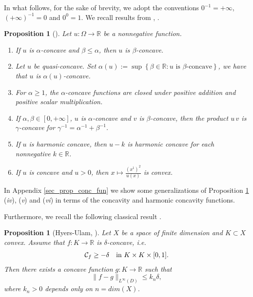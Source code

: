 \documentclass[11pt, reqno]{amsart}
\newtheorem{proposition}[lemma]{Proposition}
\theoremstyle{definition}
\numberwithin{equation}{section}
\newcommand{\R}{\mathbb{R}}
\newcommand{\tr}[1]{{\color{red} #1}}
\begin{document}
\medskip
In what follows, for the sake of brevity, we adopt the conventions $0^{-1}=+\infty$, $(+\infty)^{-1}=0$ and $0^0=1$.
We recall results from \cite[Section 2 and Lemma A2]{kennington}, \cite[Lemma 3.2]{kenningtonparabolic}.
\begin{proposition}[\cite{kennington, kenningtonparabolic}]
\label{alpha concavity property} 
Let $u\colon\Omega \to \R$ be a nonnegative function. 
	\begin{enumerate}[label=\textit{\roman*})]
		\item If $u$ is $\alpha$-concave and $\beta \leq \alpha$, then $u$ is $\beta$-concave. 
		\item Let $u$ be quasi-concave. 
		Set $ \alpha(u):=\sup \left\{\beta \in \R: u \text{ is }\beta\text{-concave}\right\}$, we have that $u$ is $\alpha(u)$-concave.
		\item For $\alpha\geq 1$, the $\alpha$-concave functions are closed under positive addition and positive scalar multiplication.
		\item If $\alpha,\beta \in [0, +\infty]$, 	$u$ is $\alpha$-concave and $v$ is $\beta$-concave, then the product $u \, v$ is $\gamma$-concave for $\gamma^{-1}=\alpha^{-1}+\beta^{-1}$.
		\item If $u$ is harmonic concave, then $u-k$ is harmonic concave for each nonnegative $k \in\R$.
		\item If $u$ is concave and $u>0$, then $x \mapsto \frac{(x^1)^2}{u(x)}$ is convex.
	\end{enumerate}
\end{proposition}

In Appendix \ref{sec_prop_conc_fun} we show some generalizations of Proposition \ref{alpha concavity property} (\textit{iv}), (\textit{v}) and (\textit{vi}) in terms of the concavity and harmonic concavity functions.



Furthermore, we recall the following classical result \cite[Theorem 2]{ulam}.
\begin{proposition}[Hyers-Ulam, \cite{ulam}] %
	\label{ulam}
	Let $ X $ be a space of finite dimension and $ K \subset X $ convex. Assume that $ f\colon K \rightarrow \mathbb{R} $ is $ \delta $-concave, i.e. 
	\[ \mathcal{C}_f \geq -\delta \quad \hbox{in $K\times K \times [0,1]$}.\] 
	Then there exists 
	a concave function $g : K \rightarrow \mathbb{R} $ such that 
	$$ \|f-g\|_{L^{\infty}(D)}\leq k_{n} \delta,$$
	 where $ k_{n}>0 $ depends only on $ n=dim(X) $.
\end{proposition}	
\end{document}
